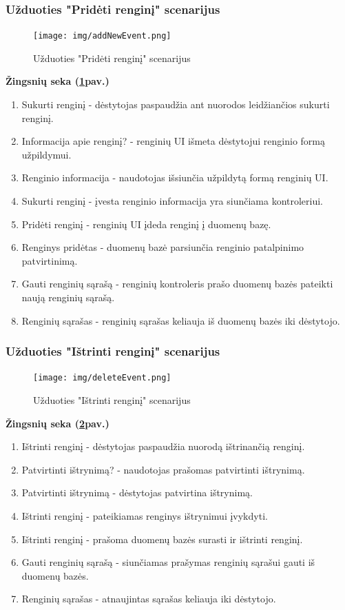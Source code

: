 \documentclass{VUMIFPSkursinis}
\begin{document}
\subsubsection{Užduoties "Pridėti renginį" scenarijus}
\begin{figure}[H]
	\centering
	\texttt{[image: img/addNewEvent.png]}
	\caption{Užduoties "Pridėti renginį" scenarijus}
	\label{fig:addNewEvent}
\end{figure}
\textbf{Žingsnių seka (\ref{fig:addNewEvent}pav.)}\\
\begin{enumerate}
	\item Sukurti renginį - dėstytojas paspaudžia ant nuorodos leidžiančios sukurti renginį.
	\item Informacija apie renginį? - renginių UI išmeta dėstytojui renginio formą užpildymui.
	\item Renginio informacija - naudotojas išsiunčia užpildytą formą renginių UI.
	\item Sukurti renginį - įvesta renginio informacija yra siunčiama kontroleriui.
	\item Pridėti renginį - renginių UI įdeda renginį į duomenų bazę.
	\item Renginys pridėtas - duomenų bazė parsiunčia renginio patalpinimo patvirtinimą.
	\item Gauti renginių sąrašą - renginių kontroleris prašo duomenų bazės pateikti naują renginių sąrašą.
	\item Renginių sąrašas - renginių sąrašas keliauja iš duomenų bazės iki dėstytojo.
\end{enumerate}
\subsubsection{Užduoties "Ištrinti renginį" scenarijus}
\begin{figure}[H]
	\centering
	\texttt{[image: img/deleteEvent.png]}
	\caption{Užduoties "Ištrinti renginį" scenarijus}
	\label{fig:delEvent}
\end{figure}
\textbf{Žingsnių seka (\ref{fig:delEvent}pav.)}\\
\begin{enumerate}
	\item Ištrinti renginį - dėstytojas paspaudžia nuorodą ištrinančią renginį.
	\item Patvirtinti ištrynimą? - naudotojas prašomas patvirtinti ištrynimą.
	\item Patvirtinti ištrynimą - dėstytojas patvirtina ištrynimą.
	\item Ištrinti renginį - pateikiamas renginys ištrynimui įvykdyti.
	\item Ištrinti renginį - prašoma duomenų bazės surasti ir ištrinti renginį.
	\item Gauti renginių sąrašą - siunčiamas prašymas renginių sąrašui gauti iš duomenų bazės.
	\item Renginių sąrašas - atnaujintas sąrašas keliauja iki dėstytojo.
\end{enumerate}
\end{document}
